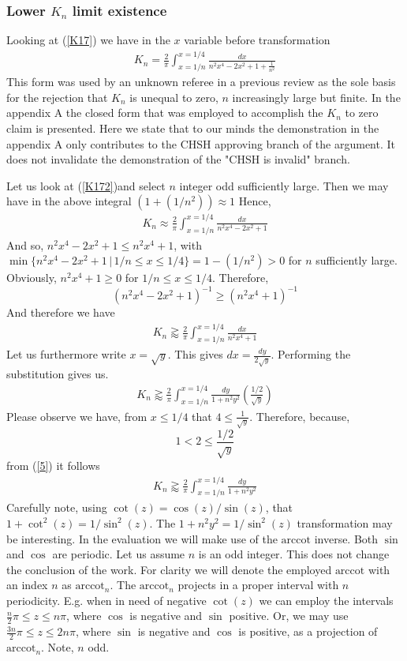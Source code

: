 \documentclass{appolb}
\newcommand{\arccot}{\text{arccot}}
\begin{document}
\subsubsection{Lower $K_n$ limit existence}
Looking at (\ref{K17}) we have in the $x$ variable before transformation
\begin{eqnarray}\label{K172}
K_n = \frac{2}{\pi} \int_{x=1/n}^{x=1/4} \frac{dx}{n^2x^4-2x^2+1+\frac{1}{n^2}}
\end{eqnarray}
This form was used by an unknown referee in a previous review as the sole basis for the rejection that $K_n$ is unequal to zero, $n$ increasingly large but finite. 
In the appendix A the closed form that was employed to accomplish the $K_n$ to zero claim is presented. 
Here we state that to our minds the demonstration in the appendix A only contributes to the CHSH approving branch of the argument. 
It does not invalidate the demonstration of the "CHSH is invalid" branch.

Let us look at (\ref{K172})and select $n$ integer odd sufficiently large. Then we may have in the above integral $(1+(1/n^2))\approx 1$
Hence,
\begin{eqnarray}\label{K173}
K_n \approx \frac{2}{\pi} \int_{x=1/n}^{x=1/4} \frac{dx}{n^2x^4-2x^2+1}
\end{eqnarray}
And so, $n^2x^4-2x^2+1\leq n^2x^4+1$, with $\min\{n^2x^4-2x^2+1\,|\,1/n \leq x \leq 1/4\}=1-(1/n^2) >0$ for $n$ sufficiently large. Obviously, $n^2x^4+1\geq 0$ for $1/n \leq x \leq 1/4$. Therefore, 
\[
(n^2x^4-2x^2+1)^{-1}\geq (n^2x^4+1)^{-1}
\]
And therefore we have
\begin{eqnarray}\label{K174}
K_n \gtrapprox \frac{2}{\pi} \int_{x=1/n}^{x=1/4} \frac{dx}{n^2x^4+1}
\end{eqnarray}
Let us furthermore write $x=\sqrt{y}$.
This gives $dx=\frac{dy}{2\sqrt{y}}$.
Performing the substitution gives us.
\begin{eqnarray}\label{H175}
K_n \gtrapprox \frac{2}{\pi} \int_{x=1/n}^{x=1/4} \frac{dy}{1+n^2y^2}\left(\frac{1/2}{\sqrt{y}}\right)
\end{eqnarray}
Please observe we have, from $x\leq 1/4$ that $4\leq \frac{1}{\sqrt{y}}$. Therefore, because, \[1<2\leq \frac{1/2}{\sqrt{y}}\] from (\ref{5}) it follows
\begin{eqnarray}\label{K176}
K_n \gtrapprox \frac{2}{\pi} \int_{x=1/n}^{x=1/4} \frac{dy}{1+n^2y^2}
\end{eqnarray}
Carefully note, using $\cot(z)=\cos(z)/\sin(z)$, that $1+\cot^2(z)=1/\sin^2(z)$. The $1+n^2y^2=1/\sin^2(z)$ transformation may be interesting. 
In the evaluation we will make use of the $\arccot$ inverse.
Both $\sin$ and $\cos$ are periodic. 
Let us assume $n $ is an odd integer. This does not change the conclusion of the work.
For clarity we will denote the employed $\arccot$ with an index $n$ as $\arccot_n$.
The $\arccot_n$ projects in a proper interval with $n$ periodicity.
E.g. when in need of negative $\cot(z)$ we can employ the intervals $\frac{n}{2}\pi\leq z\leq n\pi$, where $\cos $ is negative and $\sin$ positive. Or, we may use $\frac{3n}{2}\pi\leq z\leq 2n\pi$, where $\sin$ is negative and $\cos$ is positive, as a projection of $\arccot_n$. Note, $n$ odd.
\end{document}
